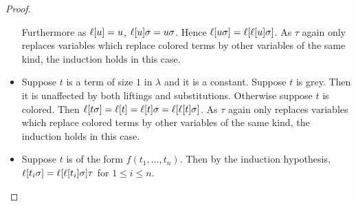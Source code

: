 \documentclass[,%
	paper=a4,%
	twoside=false,%
	liststotoc,
	bibtotoc,
	draft=false,%
	numbers=noendperiod
]{scrartcl}
\begin{document}
\begin{proof}
\begin{itemize}
				Furthermore as $\ell[u] = u$, $\ell[u]\sigma = u\sigma$. Hence $\ell[u\sigma] = \ell[\ell[u]\sigma]$. 
				As $\tau$ again only replaces variables which replace colored terms by other variables of the same kind, the induction holds in this case. 

			\item Suppose $t$ is a term of size $1$ in $\lambda$ and  it is a constant.
				Suppose $t$ is grey. Then it is unaffected by both liftings and substitutions.
				Otherwise suppose $t$ is colored. Then $\ell[t\sigma] = \ell[t] = \ell[t]\sigma = \ell[\ell[t]\sigma]$.
				As $\tau$ again only replaces variables which replace colored terms by other variables of the same kind, the induction holds in this case. 


			\item Suppose $t$ is of the form $f(t_1, \dotsc, t_n)$.
				Then by the induction hypothesis, $\ell[t_i\sigma] = \ell[\ell[t_i]\sigma]\tau$ for $1 \leq i \leq n$.
	\end{itemize}


\end{proof}
\end{document}
